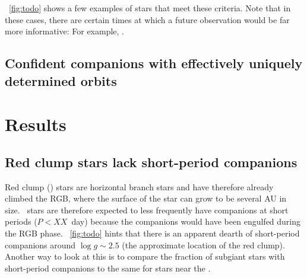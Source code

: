 \documentclass[modern, letterpaper]{aastex62}
\newcommand{\RC}{\acronym{RC}}
\begin{document}
\figurename~\ref{fig:todo} shows a few examples of stars that meet these
criteria.
Note that in these cases, there are certain times at which a future observation
would be far more informative: For example, .




\subsection{Confident companions with effectively uniquely determined orbits}
\label{sec:catalog-unimodal}





\section{Results}
\label{sec:results}

\subsection{Red clump stars lack short-period companions}


Red clump (\RC) stars are horizontal branch stars and have therefore already
climbed the RGB, where the surface of the star can grow to be several AU in
size.
\RC\ stars are therefore expected to less frequently have companions at short
periods ($P<XX$~day) because the companions would have been engulfed during the
RGB phase.
\figurename~\ref{fig:todo} hints that there is an apparent dearth of
short-period companions around $\log g \sim 2.5$ (the approximate location of
the red clump).
Another way to look at this is to compare the fraction of subgiant stars with
short-period companions to the same for stars near the \RC.
\end{document}
